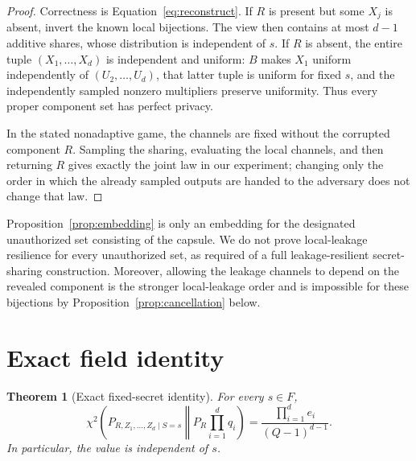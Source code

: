 \documentclass[11pt]{article}
\newtheorem{theorem}{Theorem}
\theoremstyle{definition}
\newcommand{\chitwo}{\chi^2}
\begin{document}
\begin{proof}
Correctness is Equation~\eqref{eq:reconstruct}.  If $R$ is present but some
$X_j$ is absent, invert the known local bijections.  The view then contains at
most $d-1$ additive shares, whose distribution is independent of $s$.  If $R$
is absent, the entire tuple $(X_1,\ldots,X_d)$ is independent and uniform:
$B$ makes $X_1$ uniform independently of $(U_2,\ldots,U_d)$, that latter tuple
is uniform for fixed $s$, and the independently sampled nonzero multipliers
preserve uniformity.  Thus every proper component set has perfect privacy.

In the stated nonadaptive game, the channels are fixed without the corrupted
component $R$.  Sampling the sharing, evaluating the local channels, and then
returning $R$ gives exactly the joint law in our experiment; changing only the
order in which the already sampled outputs are handed to the adversary does not
change that law.
\end{proof}

Proposition~\ref{prop:embedding} is only an embedding for the designated
unauthorized set consisting of the capsule.  We do not prove local-leakage
resilience for every unauthorized set, as required of a full leakage-resilient
secret-sharing construction.  Moreover, allowing the leakage channels to depend
on the revealed component is the stronger local-leakage order and is impossible
for these bijections by Proposition~\ref{prop:cancellation} below.

\section{Exact field identity}

\begin{theorem}[Exact fixed-secret identity]\label{thm:field}
For every $s\in F$,
\begin{equation}\label{eq:field-main}
 \chitwo\left(
    P_{R,Z_1,\ldots,Z_d\mid S=s}
    \middle\Vert
    P_R\prod_{i=1}^{d}q_i
 \right)
 =\frac{\prod_{i=1}^{d}e_i}{(Q-1)^{d-1}}.
\end{equation}
In particular, the value is independent of $s$.
\end{theorem}
\end{document}

